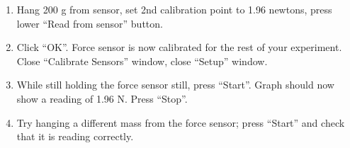 \begin{enumerate}
\item Hang 200 g from sensor, set 2nd calibration point to 1.96 newtons, press lower ``Read from sensor'' button.

\item Click ``OK''. Force sensor is now calibrated for the rest of your experiment. Close ``Calibrate Sensors'' window, close ``Setup'' window.

\item While still holding the force sensor still, press ``Start''. Graph should now show a reading of 1.96 N. Press ``Stop''.

\item Try hanging a different mass from the force sensor; press ``Start'' and check that it is reading correctly.
\end{enumerate}
